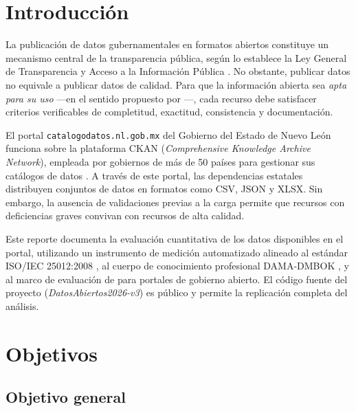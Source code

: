 \documentclass[12pt,letterpaper]{article}
\begin{document}
\newpage

\section{Introducci\'on}

La publicaci\'on de datos gubernamentales en formatos abiertos constituye un
mecanismo central de la transparencia p\'ublica, seg\'un lo establece la Ley General
de Transparencia y Acceso a la Informaci\'on P\'ublica \parencite{lgtaip2015}.
No obstante, publicar datos no equivale a publicar datos de calidad. Para que
la informaci\'on abierta sea \textit{apta para su uso} ---en el sentido propuesto
por \textcite{wang1996}---, cada recurso debe satisfacer criterios verificables
de completitud, exactitud, consistencia y documentaci\'on.

El portal \texttt{catalogodatos.nl.gob.mx} del Gobierno del Estado de Nuevo Le\'on
funciona sobre la plataforma CKAN (\textit{Comprehensive Knowledge Archive
Network}), empleada por gobiernos de m\'as de 50 pa\'ises para gestionar sus
cat\'alogos de datos \parencite{neumaier2016}. A trav\'es de este portal, las
dependencias estatales distribuyen conjuntos de datos en formatos como CSV, JSON
y XLSX. Sin embargo, la ausencia de validaciones previas a la carga permite que
recursos con deficiencias graves convivan con recursos de alta calidad.

Este reporte documenta la evaluaci\'on cuantitativa de los datos disponibles en
el portal, utilizando un instrumento de medici\'on automatizado alineado al
est\'andar ISO/IEC 25012:2008 \parencite{iso25012}, al cuerpo de conocimiento
profesional DAMA-DMBOK \parencite{dama2017}, y al marco de evaluaci\'on de
\textcite{vetro2016} para portales de gobierno abierto. El c\'odigo fuente del
proyecto (\textit{DatosAbiertos2026-v3}) es p\'ublico y permite la replicaci\'on
completa del an\'alisis.

\section{Objetivos}

\subsection{Objetivo general}
\end{document}
